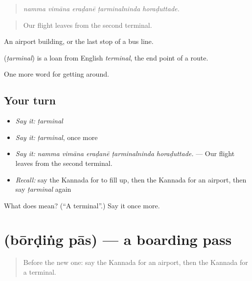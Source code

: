 \begin{quote}
\emph{namma vimāna eraḍanē ṭarminalninda horaḍuttade.}
\end{quote}

\begin{quote}
Our flight leaves from the second terminal.
\end{quote}

An airport building, or the last stop of a bus line.

\begin{cousinweb}
\textbf{} (\emph{ṭarminal}) is a loan from English \emph{terminal}, the end point of a route.
\end{cousinweb}

\begin{grammarlens}[title={What you've built}]
One more word for getting around.
\end{grammarlens}

\subsection*{Your turn}
\begin{itemize}
\raggedright
  \item \emph{Say it:} \emph{ṭarminal}
  \item \emph{Say it:} \emph{ṭarminal}, once more
  \item \emph{Say it:} \emph{namma vimāna eraḍanē ṭarminalninda horaḍuttade.} — Our flight leaves from the second terminal.
  \item \emph{Recall:} say the Kannada for to fill up, then the Kannada for an airport, then say \emph{ṭarminal} again
\end{itemize}

\begin{tcolorbox}[breakable,colback=teal!4,colframe=teal!35!black,title={Before you move on}]
What does  mean? (\textquotedblleft{}A terminal\textquotedblright{}.) Say it once more.
\end{tcolorbox}
\section[\texorpdfstring{\kn{ಬೋರ್ಡಿಂಗ್} \kn{ಪಾಸ್} (bōrḍiṅg pās)}{ಬೋರ್ಡಿಂಗ್ ಪಾಸ್ (bōrḍiṅg pās)}]{  (bōrḍiṅg pās) — a boarding pass}

\label{lesson:KA-C437-bording-pas}



\begin{quote}
Before the new one: say the Kannada for an airport, then the Kannada for a terminal.
\end{quote}

